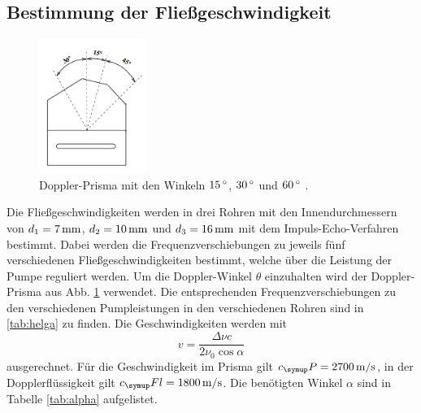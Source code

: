 \subsection{Bestimmung der Fließgeschwindigkeit}
\begin{figure}
  \centering
  \includegraphics[width=3.5cm]{bilder/winkel.png}
  \caption{Doppler-Prisma mit den Winkeln $15\,\si{\degree}$, $30\,\si{\degree}$ und $60\,\si{\degree}$ \cite{us3}.}
  \label{fig:prisma}
\end{figure}
Die Fließgeschwindigkeiten werden in drei Rohren mit den Innendurchmessern von
$d_1 = 7\,\si{\milli\meter}$, $d_2 = 10\,\si{\milli\meter}$ und $d_3=16\,\si{\milli\meter}$ mit dem Impuls-Echo-Verfahren bestimmt.
Dabei werden die Frequenzverschiebungen zu jeweils fünf verschiedenen
Fließgeschwindigkeiten bestimmt, welche über die Leistung der Pumpe reguliert werden.
Um die Doppler-Winkel $\theta$ einzuhalten wird der Doppler-Prisma aus Abb. \ref{fig:prisma} verwendet.
Die entsprechenden Frequenzverschiebungen zu den verschiedenen Pumpleistungen in den verschiedenen Rohren sind in \ref{tab:helga} zu finden.
Die Geschwindigkeiten werden mit
\begin{equation}
  v = \frac{\Delta \nu c}{2 \nu_0 \cos{\alpha}} \label{eqn:v}
\end{equation}
ausgerechnet. Für die Geschwindigkeit im Prisma gilt $c_\su{P}= 2700\vel$, in der
Dopplerflüssigkeit gilt $c_\su{Fl}=1800\vel$. Die benötigten Winkel $\alpha$ sind in Tabelle \ref{tab:alpha} aufgelistet.
